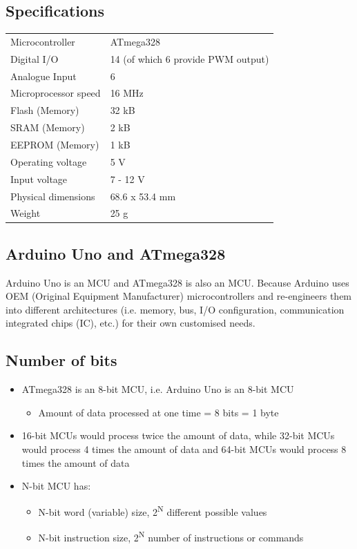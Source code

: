 \documentclass[11pt]{article}
\begin{document}
\subsection{Specifications}
\label{sec:orgb1ff7a1}
\begin{center}
\begin{tabular}{l|l}
Microcontroller & ATmega328\\[0pt]
Digital I/O & 14 (of which 6 provide PWM output)\\[0pt]
Analogue Input & 6\\[0pt]
Microprocessor speed & 16 MHz\\[0pt]
Flash (Memory) & 32 kB\\[0pt]
SRAM (Memory) & 2 kB\\[0pt]
EEPROM (Memory) & 1 kB\\[0pt]
Operating voltage & 5 V\\[0pt]
Input voltage & 7 - 12 V\\[0pt]
Physical dimensions & 68.6 x 53.4 mm\\[0pt]
Weight & 25 g\\[0pt]
\end{tabular}
\end{center}

\subsection{Arduino Uno and ATmega328}
\label{sec:org0e93a07}
Arduino Uno is an MCU and ATmega328 is also an MCU. Because Arduino uses OEM (Original Equipment Manufacturer) microcontrollers and re-engineers them into different architectures (i.e. memory, bus, I/O configuration, communication integrated chips (IC), etc.) for their own customised needs.

\subsection{Number of bits}
\label{sec:orgd5037c3}
\begin{itemize}
\item ATmega328 is an 8-bit MCU, i.e. Arduino Uno is an 8-bit MCU
\begin{itemize}
\item Amount of data processed at one time = 8 bits = 1 byte
\end{itemize}
\item 16-bit MCUs would process twice the amount of data, while 32-bit MCUs would process 4 times the amount of data and 64-bit MCUs would process 8 times the amount of data
\item N-bit MCU has:
\begin{itemize}
\item N-bit word (variable) size, 2\textsuperscript{N} different possible values
\item N-bit instruction size, 2\textsuperscript{N} number of instructions or commands
\end{itemize}
\end{itemize}
\end{document}
